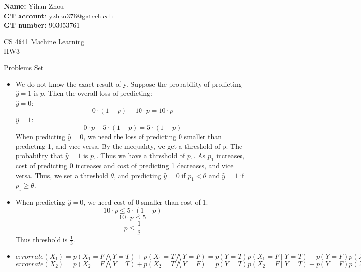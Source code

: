 \documentclass[12pt]{article}
\begin{document}
\noindent
\textbf{Name:} Yihan Zhou \smallskip  \\
\textbf{GT account:} yzhou376@gatech.edu\smallskip \\ 
\textbf{GT number:} 903053761\smallskip \\ 

\begin{center}
{
CS 4641  Machine Learning \\
HW3 \\

}

\end{center}

Problems Set

\begin{itemize}



\item[1.(a).] \smallskip We do not know the exact result of y. Suppose the probability of predicting $\hat y = 1$ is $p$. Then the overall loss of predicting:\\
$\hat y = 0$: $$ 0\cdot (1-p) + 10\cdot p = 10\cdot p$$
$\hat y = 1$: $$ 0\cdot p + 5\cdot (1-p) = 5\cdot (1-p)$$
When predicting $\hat y = 0$, we need the loss of predicting 0 smaller than predicting 1, and vice versa. By the inequality, we get a threshold of p. The probability that $\hat y = 1$ is $p_1$. Thus we have a threshold of $p_1$. As $p_1$ increases, cost of predicting 0 increases and cost of predicting 1 decreases, and vice versa. Thus, we set a threshold $ \theta$, and predicting $\hat y = 0$ if $p_1 < \theta$ and $\hat y = 1$ if $p_1 \geq \theta$.


\end{itemize}


\begin{itemize}



\item[1.(b).] \smallskip When predicting $\hat y = 0$, we need cost of 0 smaller than cost of 1. $$ 10\cdot p \leq 5\cdot (1-p)$$ $$ 10\cdot p \leq 5 $$ $$  p \leq \frac{1}{3} $$
Thus threshold is $\frac{1}{3}$.


\end{itemize}

\begin{itemize}



\item[2.(a).] \smallskip $error rate(X_1) = p(X_1 = F \bigwedge Y = T) + p(X_1 = T\bigwedge Y = F) = p(Y = T)p(X_1 = F \mid Y = T) + p(Y = F)p(X_1 = T \mid Y = F) = 0.5\cdot(1-0.8) + 0.5\cdot(1-0.7) = 0.25$\\
$error rate(X_2) = p(X_2 = F \bigwedge Y = T) + p(X_2 = T\bigwedge Y = F) = p(Y = T)p(X_2 = F \mid Y = T) + p(Y = F)p(X_2 = T \mid Y = F) = 0.5\cdot(1-0.5) + 0.5\cdot(1-0.9) = 0.3$

\end{itemize}
\end{document}
